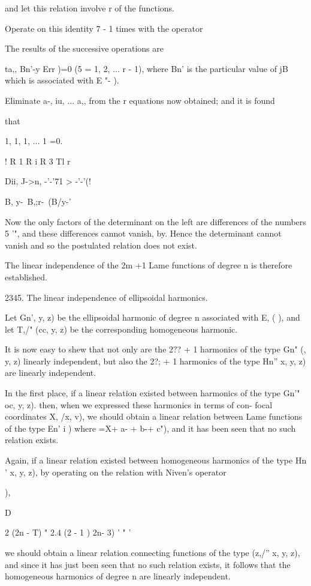 {{{{{{{and let this relation involve r of the functions.

Operate on this identity 7 - 1 times with the operator

The results of the successive operations are

ta,, Bn'-y Err )=0 (5 = 1, 2, ... r - 1), where Bn' is the particular
value of jB which is associated with E "- ).

%
%

Eliminate a-, iu, ... a,, from the r equations now obtained; and it
is found

that

1, 1, 1, ... 1 =0.

! R 1 R i R 3 Tl r

 Dii, J->n, -'-'71 >  -'-'(!

 B, y-\ B,;r-\ (B/y-'

Now the only factors of the determinant on the left are differences of
the numbers 5 '", and these differences cannot vanish, by.
Hence the determinant cannot vanish and so the postulated relation
does not exist.

The linear independence of the 2m +1 Lame functions of degree n is
therefore established.

2345. The linear independence of ellipsoidal harmonics.

Let Gn', y, z) be the ellipsoidal harmonic of degree n associated
with E, ( ), and let T,/" (cc, y, z) be the corresponding homogeneous
harmonic.

It is now easy to shew that not only are the 2?? + 1 harmonics of the
type Gn" (, y, z) linearly independent, but also the 2?; + 1
harmonics of the type Hn'' x, y, z) are linearly independent.

In the first place, if a linear relation existed between harmonics of
the type Gn'" oc, y, z). then, when we expressed these harmonics in
terms of con- focal coordinates X, /x, v), we should obtain a linear
relation between Lame functions of the type En' i ) where =X+ a- + b-+
c"), and it has been seen that no such relation exists.

Again, if a linear relation existed between homogeneous harmonics of
the type Hn ' x, y, z), by operating on the relation with Niven's
operator

),

  D\

2 (2n - T) " 2.4 (2 - 1 ) 2n- 3) ' " '

we should obtain a linear relation connecting functions of the type
(z,/'' x, y, z), and since it has just been seen that no such relation
exists, it follows that the homogeneous harmonics of degree n are
linearly independent.

}}}}}}}
